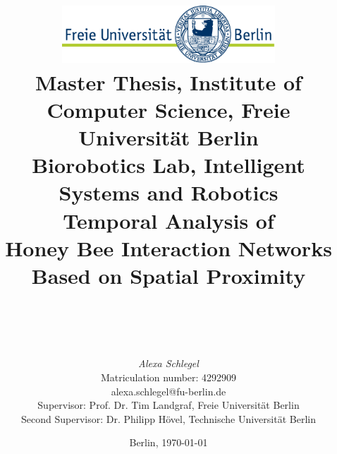 %
\begin{titlepage}

\title{\includegraphics[width=0.6\textwidth]{Resources/FU_logo.pdf}\\
{\small Master Thesis, Institute of Computer Science, Freie Universität Berlin}\\
{\small Biorobotics Lab, Intelligent Systems and Robotics}\\
[6ex]
{\LARGE Temporal Analysis of\\ Honey Bee Interaction Networks\\Based on Spatial Proximity\\}
\vspace{2ex}
\\
}

\author{
{\emph{\normalsize Alexa Schlegel}}\\
{\normalsize Matriculation number: 4292909}\\
{\normalsize alexa.schlegel@fu-berlin.de}\\ 
[15ex]   
{\normalsize Supervisor: Prof. Dr. Tim Landgraf, Freie Universität Berlin}\\
{\normalsize Second Supervisor: Dr. Philipp Hövel, Technische Universität Berlin}\\
}
\vspace{6ex}
\date{\normalsize Berlin, \today}
 
\maketitle  


\end{titlepage}